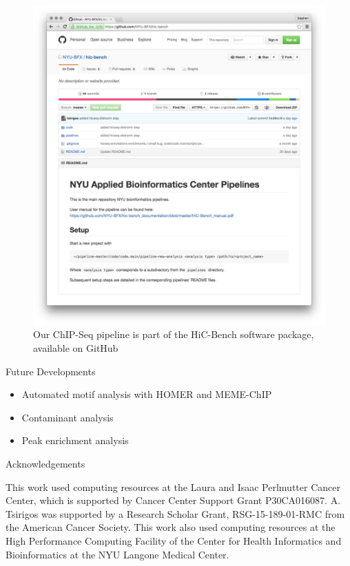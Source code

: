 \documentclass[final]{beamer}
\newlength{\onecolwid}
\begin{document}
\begin{frame}[t]
\begin{columns}[t]
\begin{column}{\onecolwid}
\begin{figure}
\includegraphics[width=1.0\linewidth]{./Figures/github_repo}
\caption{Our ChIP-Seq pipeline is part of the HiC-Bench software package, available on GitHub}
\label{fig:github_repo}
\end{figure}

\vspace{2.5cm}
\begin{beamerboxesrounded}{Future Developments}
\begin{itemize}
\item Automated motif analysis with HOMER and MEME-ChIP
\item Contaminant analysis
\item Peak enrichment analysis
\end{itemize}
\end{beamerboxesrounded}\hfill

\begin{beamerboxesrounded}{Acknowledgements}

This work used computing resources at the Laura and Isaac Perlmutter Cancer Center, which is supported by Cancer Center Support Grant P30CA016087.
A. Tsirigos was supported by a Research Scholar Grant, RSG-15-189-01-RMC
from the American Cancer Society. 
This work also used computing resources at the High Performance Computing Facility of the Center for Health Informatics and Bioinformatics at the NYU Langone Medical Center. \\


\end{beamerboxesrounded}
\end{column}
\end{columns}
\end{frame}
\end{document}
